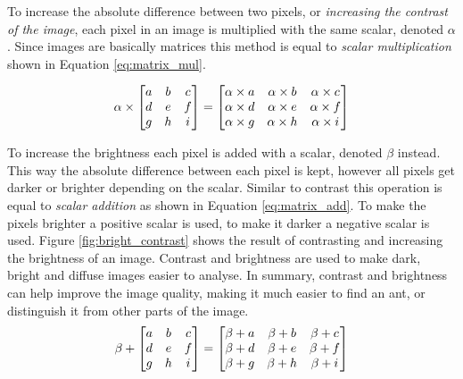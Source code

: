 To increase the absolute difference between two pixels, or \textit{increasing the contrast of the image}, each pixel in an image is multiplied with the same scalar, denoted $\alpha$. Since images are basically matrices this method is equal to \textit{scalar multiplication} shown in Equation \ref{eq:matrix_mul}.

\begin{equation}
\alpha \times 
\setlength{\arraycolsep}{5pt}
 \begin{bmatrix}
  a & b & c \\
  d & e & f \\
  g & h & i \\
 \end{bmatrix} =
 \setlength{\arraycolsep}{5pt} 
 \begin{bmatrix}
  \alpha \times a & \alpha \times b & \alpha \times c \\
  \alpha \times d & \alpha \times e & \alpha \times f \\
  \alpha \times g & \alpha \times h & \alpha \times i \\
 \end{bmatrix}
 \label{eq:matrix_mul}
\end{equation}

To increase the brightness each pixel is added with a scalar, denoted $\beta$ instead. This way the absolute difference between each pixel is kept, however all pixels get darker or brighter depending on the scalar. Similar to contrast this operation is equal to \textit{scalar addition} as shown in Equation \ref{eq:matrix_add}. To make the pixels brighter a positive scalar is used, to make it darker a negative scalar is used. Figure \ref{fig:bright_contrast} shows the result of contrasting and increasing the brightness of an image. Contrast and brightness are used to make dark, bright and diffuse images easier to analyse. In summary, contrast and brightness can help improve the image quality, making it much easier to find an ant, or distinguish it from other parts of the image.\\

\begin{equation}
\beta + 
\setlength{\arraycolsep}{5pt}
 \begin{bmatrix}
  a & b & c \\
  d & e & f \\
  g & h & i \\
 \end{bmatrix} =
 \setlength{\arraycolsep}{5pt} 
 \begin{bmatrix}
  \beta + a & \beta + b & \beta + c \\
  \beta + d & \beta + e & \beta + f \\
  \beta + g & \beta + h & \beta + i \\
 \end{bmatrix}
 \label{eq:matrix_add}
\end{equation}

